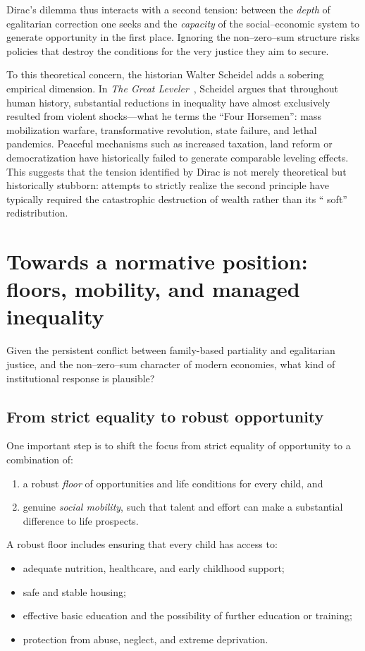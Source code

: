 \documentclass[%
  reprint,
  superscriptaddress,
  amsmath,amssymb,
  pra,
  floatfix,
  longbibliography
]{revtex4-2}
\begin{document}
Dirac's dilemma thus interacts with a second tension: between the
\emph{depth} of egalitarian correction one seeks and the \emph{capacity}
of the social--economic system to generate opportunity in the first
place.  Ignoring the non--zero--sum structure risks policies that
destroy the conditions for the very justice they aim to secure.


To this theoretical concern, the historian Walter Scheidel adds a sobering empirical dimension.
In \emph{The Great Leveler}~\cite{Scheidel-2017}, Scheidel argues that throughout human history,
substantial reductions in inequality have almost exclusively resulted from violent shocks---what he terms
the ``Four Horsemen'': mass mobilization warfare, transformative revolution, state failure, and lethal pandemics.
Peaceful mechanisms such as increased taxation, land reform or democratization have historically failed to generate comparable leveling effects.
 This suggests that the tension identified by Dirac is not merely theoretical but historically stubborn:
attempts to strictly realize the second principle have typically required the catastrophic destruction
of wealth rather than its `` soft'' redistribution.


\section{Towards a normative position: floors, mobility, and managed inequality}

Given the persistent conflict between family-based partiality and
egalitarian justice, and the non--zero--sum character of modern
economies, what kind of institutional response is plausible?

\subsection{From strict equality to robust opportunity}

One important step is to shift the focus from strict equality of
opportunity to a combination of:
\begin{enumerate}
  \item a robust \emph{floor} of opportunities and life conditions for
  every child, and
  \item genuine \emph{social mobility}, such that talent and effort can
  make a substantial difference to life prospects.
\end{enumerate}

A robust floor includes ensuring that every child has access to:
\begin{itemize}
  \item adequate nutrition, healthcare, and early childhood support;
  \item safe and stable housing;
  \item effective basic education and the possibility of further
  education or training;
  \item protection from abuse, neglect, and extreme deprivation.
\end{itemize}
\end{document}
